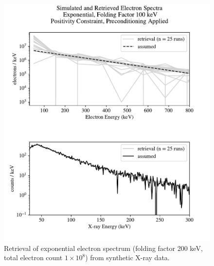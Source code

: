 \begin{figure}[p]
    \centering
    \includegraphics[width=\textwidth]{figures/chapter_4/synthetic_data_examples/exponential_folding_200keV_posonly_preconditioning_1e9_particles}
    \caption{Retrieval of exponential electron spectrum (folding factor 200 keV, total electron count $1\times10^8$) from synthetic X-ray data.}
    \label{why_non_negative_is_good}
\end{figure}

